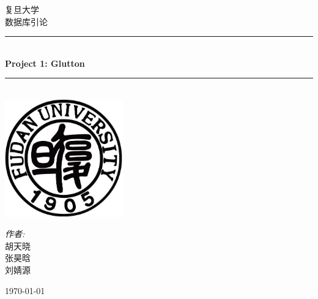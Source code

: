 \documentclass[12pt, oneside,a4paper]{article}
\newcommand{\HRule}{\rule{\linewidth}{0.5mm}}
\begin{document}
\begin{titlepage}
\begin{center}
\textsc{\LARGE 复旦大学}\\[1.5cm]
\textsc{\Large 数据库引论}\\[0.5cm]
\HRule \\[0.4cm]
{ \huge \bfseries Project 1: Glutton}\\[0.4cm]
\HRule \\[1.5cm]
\includegraphics[width=2in]{logo.jpg}\\[1cm]
\begin{minipage}{0.4\textwidth}
\begin{flushleft} \large
\begin{center}
\emph{作者:}\\
胡天晓\\
张昊晗\\
刘婧源
\end{center}
\end{flushleft}
\end{minipage}
\vfill
{\large \today}
\end{center}
\end{titlepage}

  \makeatletter
    \renewcommand{\thefigure}{\ifnum \c@section>\z@ \thesection-\fi \@arabic\c@figure}
    \renewcommand{\thetable}{\ifnum \c@section>\z@ \thesection-\fi \@arabic\c@table}
  \makeatother

\end{document}
